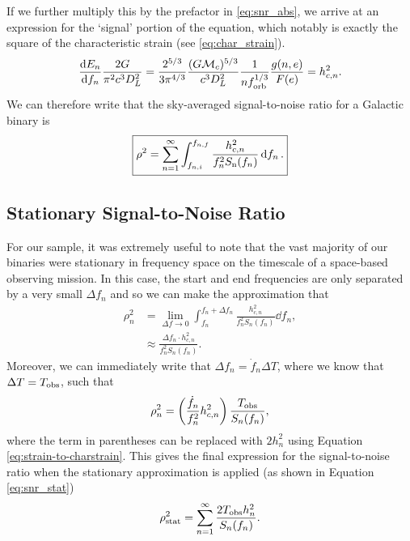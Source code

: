 \documentclass[twocolumn]{aastex63}
\begin{document}
If we further multiply this by the prefactor in \eqref{eq:snr_abs}, we arrive at an expression for the `signal' portion of the equation, which notably is exactly the square of the characteristic strain (see \eqref{eq:char_strain}).
\begin{equation}
    \dv{E_n}{f_n} \frac{2 G}{\pi^2 c^3 D_L^2} = \frac{2^{5/3} }{3 \pi^{4/3}} \frac{(G \mathcal{M}_c)^{5/3}}{c^3 D_L^2} \frac{1}{n f_{\rm orb}^{1/3}} \frac{g(n, e)}{F(e)} = h_{c,n}^2.
\end{equation}
We can therefore write that the sky-averaged signal-to-noise ratio for a Galactic binary is
\begin{equation}\label{eq:snr_general}
    \boxed{ \rho^2 = \sum_{n=1}^{\infty}  \int_{f_{n, i}}^{f_{n, f}} \frac{h_{c, n}^2}{f_n^2 S_{\rm n}(f_n)} \dd{f_n}. }
\end{equation}

\subsection{Stationary Signal-to-Noise Ratio}
For our sample, it was extremely useful to note that the vast majority of our binaries were stationary in frequency space on the timescale of a space-based observing mission. In this case, the start and end frequencies are only separated by a very small $\Delta f_n$ and so we can make the approximation that
\begin{align}
    \rho_n^2 &= \lim_{\Delta f \to 0} \int_{f_{n}}^{f_{n} + \Delta f_n} \frac{h_{c, n}^2}{f_n^2 S_n(f_n)} \dd{f_n}, \nonumber \\
    &\approx \frac{\Delta f_n \cdot h_{c, n}^2}{f_n^2 S_n(f_n)}.
\end{align}
Moreover, we can immediately write that $\Delta f_n = \dot{f}_n \Delta T$, where we know that $\Delta T = T_{\rm obs}$, such that
\begin{equation}
    \rho_n^2 = \left(\frac{\dot{f}_n}{f_n^2} h_{c, n}^2 \right) \frac{T_{\rm obs}}{S_n(f_n)},
\end{equation}
where the term in parentheses can be replaced with $2 h_n^2$ using Equation \ref{eq:strain-to-charstrain}. This gives the final expression for the signal-to-noise ratio when the stationary approximation is applied (as shown in Equation \ref{eq:snr_stat})
\begin{equation}
    \rho_{\rm stat}^2 = \sum_{n=1}^{\infty} \frac{2 T_{\rm obs} h_n^2}{S_n(f_n)} .
\end{equation}
\end{document}
